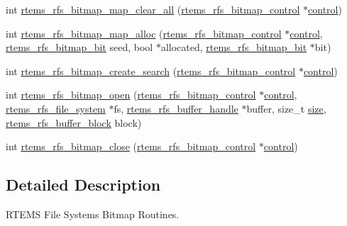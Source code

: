 \begin{DoxyCompactItemize}
\item 
int \mbox{\hyperlink{rtems-rfs-bitmaps_8c_a43897e97e0f7d1c2a7d1defad8d907da}{rtems\+\_\+rfs\+\_\+bitmap\+\_\+map\+\_\+clear\+\_\+all}} (\mbox{\hyperlink{rtems-rfs-bitmaps_8h_aa1b1de5abc294444428eb1038d7f898b}{rtems\+\_\+rfs\+\_\+bitmap\+\_\+control}} $\ast$\mbox{\hyperlink{structcontrol}{control}})
\item 
int \mbox{\hyperlink{rtems-rfs-bitmaps_8c_a6716e9aa142e1fc79cf6c645225366ed}{rtems\+\_\+rfs\+\_\+bitmap\+\_\+map\+\_\+alloc}} (\mbox{\hyperlink{rtems-rfs-bitmaps_8h_aa1b1de5abc294444428eb1038d7f898b}{rtems\+\_\+rfs\+\_\+bitmap\+\_\+control}} $\ast$\mbox{\hyperlink{structcontrol}{control}}, \mbox{\hyperlink{rtems-rfs-bitmaps_8h_acc1b0aefe1b090890ccbc1b05279a78e}{rtems\+\_\+rfs\+\_\+bitmap\+\_\+bit}} seed, bool $\ast$allocated, \mbox{\hyperlink{rtems-rfs-bitmaps_8h_acc1b0aefe1b090890ccbc1b05279a78e}{rtems\+\_\+rfs\+\_\+bitmap\+\_\+bit}} $\ast$bit)
\item 
int \mbox{\hyperlink{rtems-rfs-bitmaps_8c_a4023169caad628bff0943dbfde9a23a9}{rtems\+\_\+rfs\+\_\+bitmap\+\_\+create\+\_\+search}} (\mbox{\hyperlink{rtems-rfs-bitmaps_8h_aa1b1de5abc294444428eb1038d7f898b}{rtems\+\_\+rfs\+\_\+bitmap\+\_\+control}} $\ast$\mbox{\hyperlink{structcontrol}{control}})
\item 
int \mbox{\hyperlink{rtems-rfs-bitmaps_8c_a9365e69e28aa6b044fb68f5b56397489}{rtems\+\_\+rfs\+\_\+bitmap\+\_\+open}} (\mbox{\hyperlink{rtems-rfs-bitmaps_8h_aa1b1de5abc294444428eb1038d7f898b}{rtems\+\_\+rfs\+\_\+bitmap\+\_\+control}} $\ast$\mbox{\hyperlink{structcontrol}{control}}, \mbox{\hyperlink{struct__rtems__rfs__file__system}{rtems\+\_\+rfs\+\_\+file\+\_\+system}} $\ast$fs, \mbox{\hyperlink{rtems-rfs-buffer_8h_a17f97c37c5273ad28d413dfd2d175e23}{rtems\+\_\+rfs\+\_\+buffer\+\_\+handle}} $\ast$buffer, size\+\_\+t \mbox{\hyperlink{sun4u_2tte_8h_a245260f6f74972558f61b85227df5aae}{size}}, \mbox{\hyperlink{rtems-rfs-buffer_8h_a5650d53328a5af0a78198fe780aec043}{rtems\+\_\+rfs\+\_\+buffer\+\_\+block}} block)
\item 
int \mbox{\hyperlink{rtems-rfs-bitmaps_8c_a9c5c4b4e9f3e518b9b1d9bed4824c67c}{rtems\+\_\+rfs\+\_\+bitmap\+\_\+close}} (\mbox{\hyperlink{rtems-rfs-bitmaps_8h_aa1b1de5abc294444428eb1038d7f898b}{rtems\+\_\+rfs\+\_\+bitmap\+\_\+control}} $\ast$\mbox{\hyperlink{structcontrol}{control}})
\end{DoxyCompactItemize}


\subsection{Detailed Description}
R\+T\+E\+MS File Systems Bitmap Routines. 

